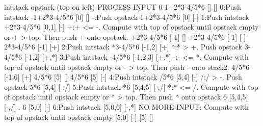 {\scriptsize
\begin{console}
              intstack opstack (top on left)
                              PROCESS INPUT
0-1+2*3-4/5*6 []       []
                              0:Push intstack
 -1+2*3-4/5*6 [0]      []
                              -:Push opstack
  1+2*3-4/5*6 [0]      [-]
                              1:Push intstack
   +2*3-4/5*6 [0,1]    [-]
                              +:+ <= -. Compute with top of
                                opstack until opstack empty or
                                + > top.
                                Then push + onto opstack.
   +2*3-4/5*6 [-1]     []
   +2*3-4/5*6 [-1]     [-]
    2*3-4/5*6 [-1]     [+]
                              2:Push intstack
     *3-4/5*6 [-1,2]   [+]
                              *:* > +. Push opstack
      3-4/5*6 [-1,2]   [+,*]
                              3:Push intstack
       -4/5*6 [-1,2,3] [+,*]
                              -:- <= *. Compute with top of
                                opstack until opstack empty or
                                - > top.
                                Then push - onto stack2.
        4/5*6 [-1,6]   [+]
        4/5*6 [5]      []
        4/5*6 [5]      [-]
                              4:Push intstack
         /5*6 [5,4]    [-]
                              /:/ > -. Push opstack
          5*6 [5,4]    [-,/]
                              5:Push intstack
           *6 [5,4,5]  [-,/]  
                              *:* <= /. Compute with top of
                                opstack until opstack empty or
                                * > top.
                                Then push * onto opstack
            6 [5,4,5]  [-,/]  .
            6 [5,0]    [-]
                              6:Push intstack
              [5,0,6]  [-,*]  
                              NO MORE INPUT: Compute with
                              top of opstack until opstack
                              empty                             
              [5,0]    [-]
              [5]      []
\end{console}
}

